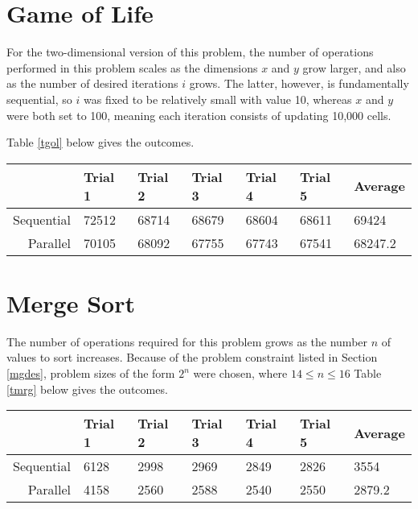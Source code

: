 \section{Game of Life}
For the two-dimensional version of this problem, 
the number of operations performed in this problem scales 
as the dimensions $x$ and $y$ grow larger, 
and also as the number of desired iterations $i$ grows. 
The latter, however, is fundamentally sequential, 
so $i$ was fixed to be relatively small with value 10, 
whereas $x$ and $y$ were both set to 100, 
meaning each iteration consists of updating 10,000 cells.

Table \ref{tgol} below gives the outcomes.

\begin{center}
\begin{tabular}{|r|l|l|l|l|l||l|}
\label{tgol}
	           & Trial 1 & Trial 2 & Trial 3 & Trial 4 & Trial 5 & Average \\ \hline
	Sequential & 72512   & 68714   & 68679   & 68604   & 68611   & 69424   \\ \hline
	Parallel   & 70105   & 68092   & 67755   & 67743   & 67541   & 68247.2 \\ \hline
\end{tabular}
\end{center}

\section{Merge Sort}
The number of operations required for this problem 
grows as the number $n$ of values to sort increases. 
Because of the problem constraint listed in Section \ref{mgdes}, 
problem sizes of the form $2^n$ were chosen, 
where $14 \le n \le 16$
Table \ref{tmrg} below gives the outcomes.

\begin{center}
\begin{tabular}{|r|l|l|l|l|l||l|}
\label{tmrg}
			   & Trial 1 & Trial 2 & Trial 3 & Trial 4 & Trial 5 & Average \\ \hline
	Sequential & 6128    & 2998    & 2969    & 2849    & 2826    & 3554    \\ \hline
	Parallel   & 4158    & 2560    & 2588    & 2540    & 2550    & 2879.2  \\ \hline
\end{tabular}
\end{center}
